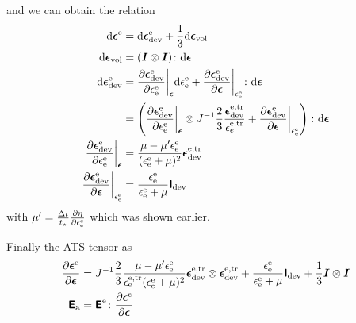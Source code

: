 \documentclass[a4paper,11pt]{article}
\newcommand{\tf}[1]{\text{\boldmath $\sf #1$}}
\newcommand{\ts}[1]{\text{\boldmath $#1$}}
\newcommand{\pderiv}[2]{\frac{\partial #1}{\partial #2}}
\newcommand{\dev}{{\rm dev}}
\newcommand{\vol}{{\rm vol}}
\newcommand{\rmd}{{\rm d}}
\newcommand{\rme}{{\rm e}}
\newcommand{\ATS}{\tf{E}_{\rm a}}
\begin{document}
and we can obtain the relation
\begin{align}
	\rmd\ts\epsilon^\rme &= \rmd\ts\epsilon_\dev^\rme + \frac13\rmd\ts\epsilon_\vol \\
	\rmd\ts\epsilon_\vol &= (\ts I\otimes\ts I)\colon\rmd\ts\epsilon\\
	\rmd\ts\epsilon_\dev^\rme &= \pderiv{\ts\epsilon_\dev^\rme}{\epsilon_\rme^\rme}\bigg|_{\ts\epsilon}\rmd\epsilon_\rme^\rme 
		+ \pderiv{\ts\epsilon_\dev^\rme}{\ts\epsilon}\bigg|_{\epsilon_\rme^\rme}\colon\rmd\ts\epsilon \\
		&= \left(\pderiv{\ts\epsilon_\dev^\rme}{\epsilon_\rme^\rme}\bigg|_{\ts\epsilon}\otimes J^{-1}\frac23\frac{\ts\epsilon_\dev^{\rme,\rm tr}}{\epsilon_e^{\rme,\rm tr}}
		+ \pderiv{\ts\epsilon_\dev^\rme}{\ts\epsilon}\bigg|_{\epsilon_\rme^\rme}\right)\colon\rmd\ts\epsilon\\
	\pderiv{\ts\epsilon_\dev^\rme}{\epsilon_\rme^\rme}\bigg|_{\ts\epsilon} &= \frac{\mu-\mu'\epsilon_\rme^\rme}{(\epsilon_\rme^\rme+\mu)^2}\ts\epsilon_\dev^{\rme,\rm tr}\\
	\pderiv{\ts\epsilon_\dev^\rme}{\ts\epsilon}\bigg|_{\epsilon_\rme^\rme} &= \frac{\epsilon_\rme^\rme}{\epsilon_\rme^\rme + \mu} \tf I_\dev
\end{align}
with $\mu' = \frac{\Delta t}{t_\star}\pderiv{\eta}{\epsilon_\rme^\rme}$ which was shown earlier. 

Finally the ATS tensor as
\begin{align}
	\pderiv{\ts\epsilon^\rme}{\ts\epsilon} &= J^{-1} \frac23\frac{\mu-\mu'\epsilon_\rme^\rme}{\epsilon_\rme^{\rme,\rm tr}(\epsilon_\rme^\rme+\mu)^2}
		\ts\epsilon_\dev^{\rme,\rm tr}\otimes\ts\epsilon_\dev^{\rme,\rm tr} + 
		\frac{\epsilon_\rme^\rme}{\epsilon_\rme^\rme+\mu} \tf I_\dev + \frac13\ts I\otimes\ts I\\
	\ATS &= \tf E^\rme\colon\pderiv{\ts\epsilon^\rme}{\ts\epsilon}
\end{align}
\end{document}
